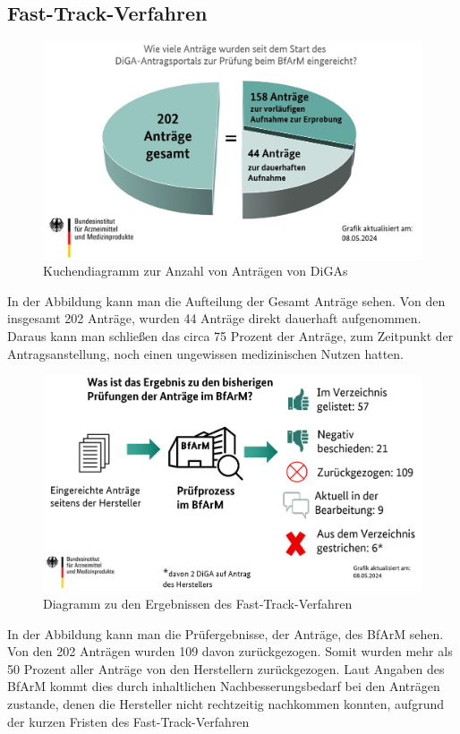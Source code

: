 \documentclass{article}
\begin{document}
		\subsection{Fast-Track-Verfahren} 
			\begin{figure}[htbp]
				\includegraphics[width=\textwidth]{./grafiken/Anzahl_Antraege_DiGA}
				\caption[Anzahl Anträge von DiGAs]{Kuchendiagramm zur Anzahl von Anträgen von DiGAs}
				\label{Abb-antragsanzahl-diga}
			\end{figure}
			In der Abbildung kann man die Aufteilung der Gesamt Anträge sehen. Von den insgesamt 202 Anträge, wurden 44 Anträge direkt dauerhaft aufgenommen. Daraus kann man schließen das circa 75 Prozent der Anträge, zum Zeitpunkt der Antragsanstellung, noch einen ungewissen medizinischen Nutzen hatten.
			\newpage
			\begin{figure}[htbp]
				\includegraphics[width=\textwidth]{./grafiken/Ergebnis_Pruefungen_DiGA}
				\caption[Abbildung zu den Ergebnissen des Fast-Track-Verfahren]{Diagramm zu den Ergebnissen des Fast-Track-Verfahren}
				\label{Abb-ergebnisse-ft}
			\end{figure} 
			In der Abbildung kann man die Prüfergebnisse, der Anträge, des BfArM sehen. Von den 202 Anträgen wurden 109 davon zurückgezogen. Somit wurden mehr als 50 Prozent aller Anträge von den Herstellern zurückgezogen. Laut Angaben des BfArM kommt dies durch inhaltlichen Nachbesserungsbedarf bei den Anträgen zustande, denen die Hersteller nicht rechtzeitig nachkommen konnten, aufgrund der kurzen Fristen des Fast-Track-Verfahren\cite[vgl. Z. 37]{tipps-diga-antragsansteller}       



\end{document}
